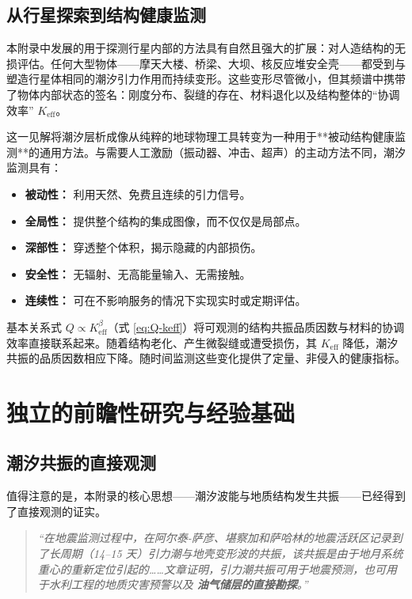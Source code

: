 \documentclass[12pt,a4paper]{article}
\theoremstyle{remark}
\begin{document}
	\subsection{从行星探索到结构健康监测}
	\label{sec:beyond-geophysics}
	
	本附录中发展的用于探测行星内部的方法具有自然且强大的扩展：对人造结构的无损评估。任何大型物体——摩天大楼、桥梁、大坝、核反应堆安全壳——都受到与塑造行星体相同的潮汐引力作用而持续变形。这些变形尽管微小，但其频谱中携带了物体内部状态的签名：刚度分布、裂缝的存在、材料退化以及结构整体的“协调效率” \(K_{\mathrm{eff}}\)。
	
	这一见解将潮汐层析成像从纯粹的地球物理工具转变为一种用于**被动结构健康监测**的通用方法。与需要人工激励（振动器、冲击、超声）的主动方法不同，潮汐监测具有：
	\begin{itemize}
		\item \textbf{被动性：} 利用天然、免费且连续的引力信号。
		\item \textbf{全局性：} 提供整个结构的集成图像，而不仅仅是局部点。
		\item \textbf{深部性：} 穿透整个体积，揭示隐藏的内部损伤。
		\item \textbf{安全性：} 无辐射、无高能量输入、无需接触。
		\item \textbf{连续性：} 可在不影响服务的情况下实现实时或定期评估。
	\end{itemize}
	
	基本关系式 \(Q \propto K_{\mathrm{eff}}^{\beta}\)（式 \ref{eq:Q-keff}）将可观测的结构共振品质因数与材料的协调效率直接联系起来。随着结构老化、产生微裂缝或遭受损伤，其 \(K_{\mathrm{eff}}\) 降低，潮汐共振的品质因数相应下降。随时间监测这些变化提供了定量、非侵入的健康指标。
	
	\section{独立的前瞻性研究与经验基础}
	\label{sec:prior}
	
	\subsection{潮汐共振的直接观测}
	
	值得注意的是，本附录的核心思想——潮汐波能与地质结构发生共振——已经得到了直接观测的证实。
	
	\begin{quotation}
		\noindent
		\textit{“在地震监测过程中，在阿尔泰-萨彦、堪察加和萨哈林的地震活跃区记录到了长周期（14–15 天）引力潮与地壳变形波的共振，该共振是由于地月系统重心的重新定位引起的……文章证明，引力潮共振可用于地震预测，也可用于水利工程的地质灾害预警以及 \textbf{油气储层的直接勘探}。”} \cite{Sibgatulin2014}
	\end{quotation}
	
\end{document}
